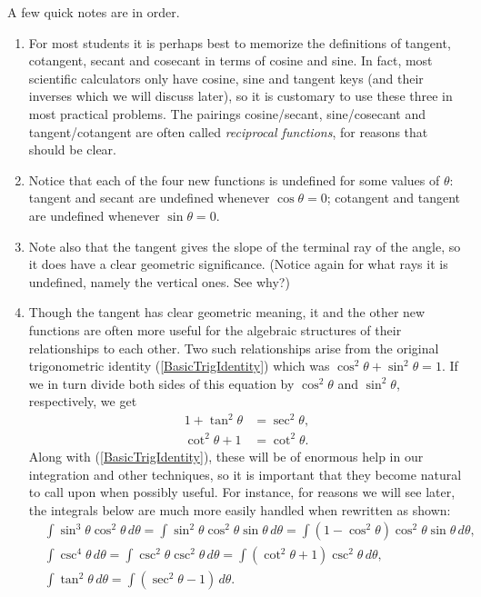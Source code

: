 A few quick notes are in order.  
\begin{enumerate}
\item For most students it
is perhaps best to memorize the definitions of 
tangent, cotangent, secant and cosecant
in terms of cosine and sine.  
In fact, most scientific calculators only have 
cosine, sine and tangent keys (and their inverses
which we will discuss later), so it is customary 
to use these three in most practical problems.
The pairings cosine/secant, sine/cosecant and
tangent/cotangent are often called {\it reciprocal
functions}, for reasons that should be clear.
\item Notice that each of the four new functions
is undefined for some values of $\theta$:
tangent and secant are undefined whenever $\cos\theta=0$;
cotangent and tangent are undefined whenever $\sin\theta=0$.
\item Note also that the tangent gives the slope of the terminal
ray of the angle, so it does have a clear geometric
significance. (Notice again for what rays it is undefined,
namely the vertical ones.  See why?)  
\item Though the tangent has clear geometric meaning,
it and the other new functions are often more useful for the
algebraic structures of their relationships to each
other.  Two such relationships arise from the
original trigonometric identity (\ref{BasicTrigIdentity}) which was
$\cos^2\theta+\sin^2\theta=1$.  If we in turn divide 
both sides of this equation by $\cos^2\theta$ and
$\sin^2\theta$, respectively, we get
\begin{align}
 1+\tan^2\theta&=\sec^2\theta,\label{Tan^2/Sec^2}\\
 \cot^2\theta+1&=\cot^2\theta.\label{Cot^2/Csc^2}\end{align}
Along with (\ref{BasicTrigIdentity}), these will be
of enormous help in our integration and other techniques,
so it is important that they become natural to call upon
when possibly useful.  For instance,
for reasons we will see later, the integrals below are much 
more easily handled when rewritten as shown:
\begin{align*}
&\int\sin^3\theta\cos^2\theta\,d\theta
=\int\sin^2\theta\cos^2\theta\sin\theta\,d\theta
=\int(1-\cos^2\theta)\cos^2\theta\sin\theta\,d\theta,\\
&\int\csc^4\theta\,d\theta
  =\int\csc^2\theta\csc^2\theta\,d\theta
  =\int(\cot^2\theta+1)\csc^2\theta\,d\theta,\\
&\int\tan^2\theta\,d\theta=\int(\sec^2\theta-1)\,d\theta.
\end{align*}

\end{enumerate}
